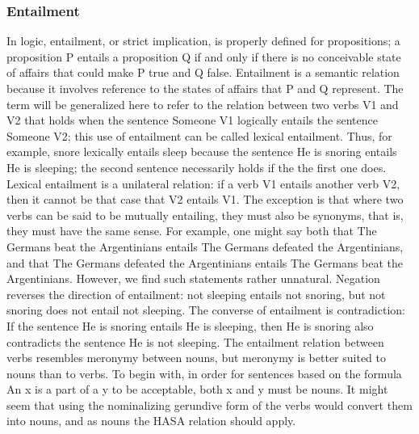 \subsubsection{Entailment}
In logic, entailment, or strict implication, is properly defined for propositions; a proposition P entails a proposition Q if and only if there is no conceivable state of affairs that could make P true and Q false. Entailment is a semantic relation because it involves reference to the states of affairs that P and Q represent. The term will be generalized here to refer to the relation between two verbs V1 and V2 that holds when the sentence Someone V1 logically entails the sentence Someone V2; this use of entailment can be called lexical entailment. Thus, for example, snore lexically entails sleep because the sentence He is snoring entails He is sleeping; the second sentence necessarily holds if the the first one does. Lexical entailment is a unilateral relation: if a verb V1 entails another verb V2, then it cannot be that case that V2 entails V1. The exception is that where two verbs can be said to be mutually entailing, they must also be synonyms, that is, they must have the same sense. For example, one might say both that The Germans beat the Argentinians entails The Germans defeated the Argentinians, and that The Germans defeated the Argentinians entails The Germans beat the Argentinians. However, we find such statements rather unnatural. Negation reverses the direction of entailment: not sleeping entails not snoring, but not snoring does not entail not sleeping. The converse of entailment is contradiction: If the sentence He is snoring entails He is sleeping, then He is snoring also contradicts the sentence He is not sleeping. The entailment relation between verbs resembles meronymy between nouns, but meronymy is better suited to nouns than to verbs. To begin with, in order for sentences based on the formula An x is a part of a y to be acceptable, both x and y must be nouns. It might seem that using the nominalizing gerundive form of the verbs would convert them into nouns, and as nouns the HASA relation should apply.

